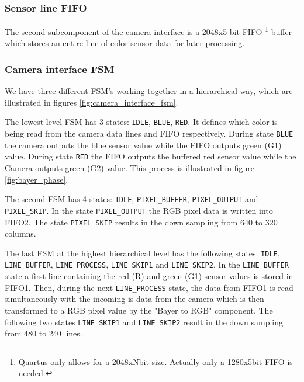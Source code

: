 \documentclass{article}
\begin{document}
\subsubsection{Sensor line FIFO}
The second subcomponent of the camera interface is a 2048x5-bit FIFO
\footnote{Quartus only allows for a 2048xNbit size. Actually only a 1280x5bit FIFO is needed.}
buffer which stores an entire line of color sensor data for later processing.

\subsubsection{Camera interface FSM}

We have three different FSM's working together in a hierarchical way, which are illustrated in figures \ref{fig:camera_interface_fsm}.

The lowest-level FSM has 3 states: \verb'IDLE', \verb'BLUE', \verb'RED'.
It defines which color is being read from the camera data lines and FIFO respectively. During state \verb'BLUE' the camera outputs the blue sensor value while the FIFO outputs green (G1) value. During state \verb'RED' the FIFO outputs the buffered red sensor value while the Camera outputs green (G2) value. This process is illustrated in figure \ref{fig:bayer_phase}.

The second FSM has 4 states: \verb'IDLE', \verb'PIXEL_BUFFER', \verb'PIXEL_OUTPUT' and \verb'PIXEL_SKIP'. In the state \verb'PIXEL_OUTPUT' the RGB pixel data is written into FIFO2. The state \verb'PIXEL_SKIP' results in the down sampling from 640 to 320 columns.

The last FSM at the highest hierarchical level has the following states:  \verb'IDLE', \verb'LINE_BUFFER', \verb'LINE_PROCESS', \verb'LINE_SKIP1' and \verb'LINE_SKIP2'. In the \verb'LINE_BUFFER' state a first line containing the red (R) and green (G1) sensor values is stored in FIFO1. Then, during the next \verb'LINE_PROCESS' state, the data from FIFO1 is read simultaneously with the incoming is data from the camera which is then transformed to a RGB pixel value by the "Bayer to RGB" component. The following two states \verb'LINE_SKIP1' and \verb'LINE_SKIP2' result in the down sampling from 480 to 240 lines.

\end{document}
